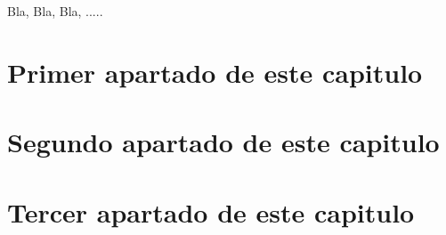 


Bla, Bla, Bla, .....

\section{Primer apartado de este capitulo}
\label{3:sec1}

\section{Segundo apartado de este capitulo}
\label{3:sec2}

\section{Tercer apartado de este capitulo}
\label{:sec3}
